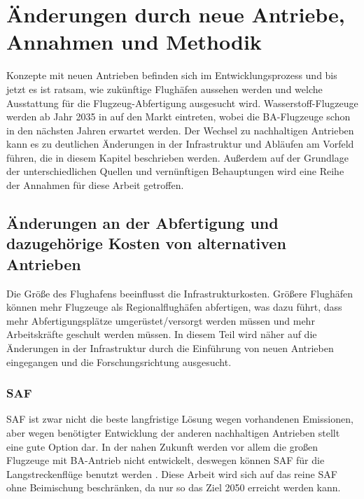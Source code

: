 \chapter{Änderungen durch neue Antriebe, Annahmen und Methodik}
\label{ch:Änderungen durch neue Antriebe, Annahmen und Methodik}

Konzepte mit neuen Antrieben befinden sich im Entwicklungsprozess und bis jetzt es ist ratsam, wie zukünftige Flughäfen aussehen werden
und welche Ausstattung für die Flugzeug-Abfertigung ausgesucht wird. Wasserstoff-Flugzeuge werden ab Jahr 2035 in 
auf den Markt eintreten, wobei die BA-Flugzeuge schon in den nächsten Jahren erwartet werden.
Der Wechsel zu nachhaltigen Antrieben kann es zu deutlichen Änderungen in der Infrastruktur und Abläufen am Vorfeld führen, die
in diesem Kapitel beschrieben werden.
Außerdem auf der Grundlage der unterschiedlichen Quellen und vernünftigen Behauptungen wird eine Reihe der Annahmen für diese Arbeit getroffen.
%

\section{Änderungen an der Abfertigung und dazugehörige Kosten von alternativen Antrieben}
\label{s:Änderungen an der Abfertigung und dazugehörige Kosten von alternativen Antrieben}

Die Größe des Flughafens beeinflusst die Infrastrukturkosten. Größere Flughäfen können mehr Flugzeuge als Regionalflughäfen 
abfertigen, was dazu führt, dass mehr Abfertigungsplätze umgerüstet/versorgt werden müssen und mehr Arbeitskräfte geschult werden müssen. 
In diesem Teil wird näher auf die Änderungen in der Infrastruktur durch die Einführung von neuen Antrieben eingegangen und 
die Forschungsrichtung ausgesucht.

\subsection{SAF}
SAF ist zwar nicht die beste langfristige Lösung wegen vorhandenen Emissionen, aber wegen benötigter Entwicklung der anderen nachhaltigen
Antrieben stellt eine gute Option dar. In der nahen Zukunft werden vor allem die großen Flugzeuge mit BA-Antrieb nicht entwickelt, 
deswegen können SAF für die Langstreckenflüge benutzt werden \cite{dalmia2022powering}.
Diese Arbeit wird sich auf das reine SAF ohne Beimischung beschränken, da nur so das Ziel 2050 erreicht werden kann.

